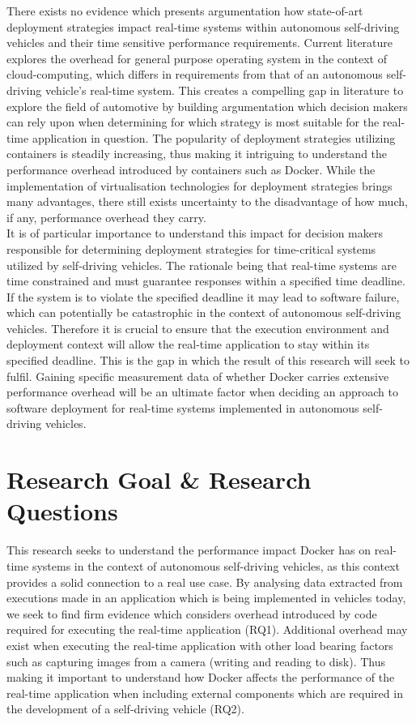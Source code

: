 There exists no evidence which presents argumentation how state-of-art deployment strategies impact real-time systems within autonomous self-driving vehicles and their time sensitive performance requirements. Current literature \cite{vmvscontainers} explores the overhead for general purpose operating system in the context of cloud-computing, which differs in requirements from that of an autonomous self-driving vehicle's real-time system. This creates a compelling gap in literature to explore the field of automotive by building argumentation which decision makers can rely upon when determining for which strategy is most suitable for the real-time application in question. The popularity of deployment strategies utilizing containers is steadily increasing, thus making it intriguing to understand the performance overhead introduced by containers such as Docker. While the implementation of virtualisation technologies for deployment strategies brings many advantages, there still exists uncertainty to the disadvantage of how much, if any, performance overhead they carry.\\

It is of particular importance to understand this impact for decision makers responsible for determining deployment strategies for time-critical systems utilized by self-driving vehicles. The rationale being that real-time systems are time constrained and must guarantee responses within a specified time deadline. If the system is to violate the specified deadline it may lead to software failure, which can potentially be catastrophic in the context of autonomous self-driving vehicles. Therefore it is crucial to ensure that the execution environment and deployment context will allow the real-time application to stay within its specified deadline. This is the gap in which the result of this research will seek to fulfil. Gaining specific measurement data of whether Docker carries extensive performance overhead will be an ultimate factor when deciding an approach to software deployment for real-time systems implemented in autonomous self-driving vehicles.\\

\section{Research Goal \& Research Questions}
This research seeks to understand the performance impact Docker has on real-time systems in the context of autonomous self-driving vehicles, as this context provides a solid connection to a real use case. By analysing data extracted from executions made in an application which is being implemented in vehicles today, we seek to find firm evidence which considers overhead introduced by code required for executing the real-time application (RQ1). Additional overhead may exist when executing the real-time application with other load bearing factors such as capturing images from a camera (writing and reading to disk). Thus making it important to understand how Docker affects the performance of the real-time application when including external components which are required in the development of a self-driving vehicle (RQ2).\\

